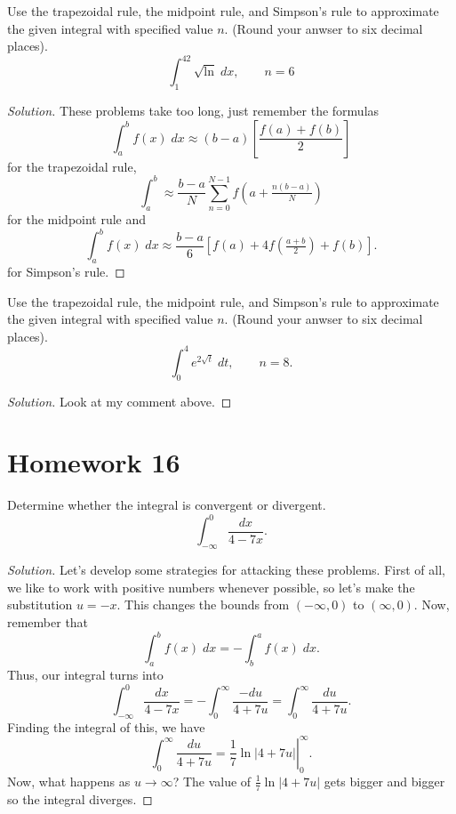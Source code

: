 \begin{problem}[WebAssign, HW 15, \# 5]
Use the trapezoidal rule, the midpoint rule, and Simpson's rule to
approximate the given integral with specified value $n$. (Round your anwser
to six decimal places).
\[
\int_1^42\sqrt{\ln}\;dx,\qquad n=6
\]
\end{problem}
\begin{proof}[Solution]
These problems take too long, just remember the formulas
\begin{equation}
\label{eq:trapezoidal-rule}
\int_a^b f(x)\;dx\approx(b-a)\left[\frac{f(a)+f(b)}{2}\right]
\end{equation}
for the trapezoidal rule,
\begin{equation}
  \label{eq:midpoint-rule}
\int_a^b\approx\frac{b-a}{N}\sum_{n=0}^{N-1}f\left(a+\tfrac{n(b-a)}{N}\right)
\end{equation}
for the midpoint rule and
\begin{equation}
  \label{eq:simpsons-rule}
\int_a^b f(x)\;dx\approx
\frac{b-a}{6}\left[f(a)+4f\left(\tfrac{a+b}{2}\right)+f(b)\right].
\end{equation}
for Simpson's rule.
\end{proof}

\begin{problem}[WebAssign, HW 15, \# 6]
Use the trapezoidal rule, the midpoint rule, and Simpson's rule to
approximate the given integral with specified value $n$. (Round your anwser
to six decimal places).
\[
\int_0^4 e^{2\sqrt{t}}\;dt,\qquad n=8.
\]
\end{problem}
\begin{proof}[Solution]
Look at my comment above.
\end{proof}

\section{Homework 16}
\begin{problem}[WebAssign, HW 16, \# 1]
Determine whether the integral is convergent or divergent.
\[
\int_{-\infty}^0\frac{dx}{4-7x}.
\]
\end{problem}
\begin{proof}[Solution]
Let's develop some strategies for attacking these problems. First of all,
we like to work with positive numbers whenever possible, so let's make the
substitution $u=-x$. This changes the bounds  from $(-\infty,0)$ to
$(\infty,0)$. Now, remember that
\begin{equation}
\label{eq:reverse-integration}
\int_a^b f(x)\;dx=-\int_b^a f(x)\;dx.
\end{equation}
Thus, our integral turns into
\[
\int_{-\infty}^0\frac{dx}{4-7x}=
-\int_0^\infty\frac{-du}{4+7u}=
\int_0^\infty\frac{du}{4+7u}.
\]
Finding the integral of this, we have
\[
\int_0^\infty\frac{du}{4+7u}=\left.\frac{1}{7}\ln|4+7u|\right|_0^\infty.
\]
Now, what happens as $u\to\infty$? The value of $\frac{1}{7}\ln|4+7u|$ gets
bigger and bigger so the integral diverges.
\end{proof}

